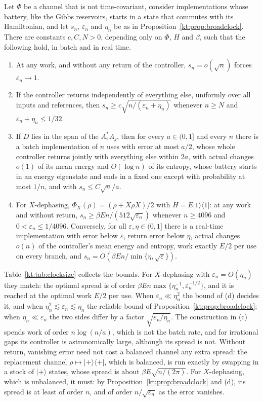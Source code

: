 \begin{proposition}\label{kt:prop:clocksize}
Let $\Phi$ be a channel that is not time-covariant, consider implementations whose battery, like the Gibbs reservoirs, starts in a state that commutes with its Hamiltonian, and let $s_n$, $\varepsilon_n$ and $\eta_n$ be as in Proposition~\ref{kt:prop:broadclock}. There are constants $c,C,N>0$, depending only on $\Phi$, $H$ and $\beta$, such that the following hold, in batch and in real time.
\begin{enumerate}[label=(\alph*)]
\item At any work, and without any return of the controller, $s_n=o(\sqrt n)$ forces $\varepsilon_n\to1$.
\item If the controller returns independently of everything else, uniformly over all inputs and references, then $s_n\ge c\sqrt{n/(\varepsilon_n+\eta_n)}$ whenever $n\ge N$ and $\varepsilon_n+\eta_n\le1/32$.
\item If $D$ lies in the span of the $A_i^*A_j$, then for every $a\in(0,1]$ and every $n$ there is a batch implementation of $n$ uses with error at most $a/2$, whose whole controller returns jointly with everything else within $2a$, with actual changes $o(1)$ of its mean energy and $O(\log n)$ of its entropy, whose battery starts in an energy eigenstate and ends in a fixed one except with probability at most $1/n$, and with $s_n\le C\sqrt n/a$.
\item For $X$-dephasing, $\Phi_X(\rho)=(\rho+X\rho X)/2$ with $H=E|1\rangle\langle1|$: at any work and without return, $s_n\ge\beta En/(512\sqrt{\varepsilon_n})$ whenever $n\ge4096$ and $0<\varepsilon_n\le1/4096$. Conversely, for all $\varepsilon,\eta\in(0,1]$ there is a real-time implementation with error below $\varepsilon$, return error below $\eta$, actual changes $o(n)$ of the controller's mean energy and entropy, work exactly $E/2$ per use on every branch, and $s_n=O(\beta En/\min\{\eta,\sqrt\varepsilon\})$.
\end{enumerate}
\end{proposition}

Table~\ref{kt:tab:clocksize} collects the bounds. For $X$-dephasing with $\varepsilon_n=O(\eta_n)$ they match: the optimal spread is of order $\beta En\max\{\eta_n^{-1},\varepsilon_n^{-1/2}\}$, and it is reached at the optimal work $E/2$ per use. When $\varepsilon_n\ll\eta_n^2$ the bound of (d) decides it, and when $\eta_n^2\lesssim\varepsilon_n\lesssim\eta_n$ the reliable bound of Proposition~\ref{kt:prop:broadclock}; when $\eta_n\ll\varepsilon_n$ the two sides differ by a factor $\sqrt{\varepsilon_n/\eta_n}$. The construction in (c) spends work of order $n\log(n/a)$, which is not the batch rate, and for irrational gaps its controller is astronomically large, although its spread is not. Without return, vanishing error need not cost a balanced channel any extra spread: the replacement channel $\rho\mapsto|+\rangle\langle+|$, which is balanced, is run exactly by swapping in a stock of $|+\rangle$ states, whose spread is about $\beta E\sqrt{n/(2\pi)}$. For $X$-dephasing, which is unbalanced, it must: by Proposition~\ref{kt:prop:broadclock} and (d), its spread is at least of order $n$, and of order $n/\sqrt{\varepsilon_n}$ as the error vanishes.

